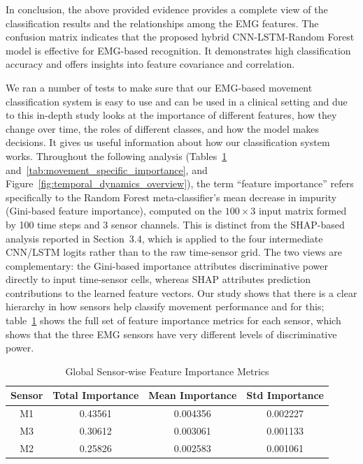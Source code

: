 \documentclass{elektr}
\newcommand{\yh}[1]{{\color{revhi}#1}}  %
\begin{document}
In conclusion, the above provided evidence provides a complete view of the classification results and the relationships among the EMG features. The confusion matrix indicates that the proposed hybrid CNN-LSTM-Random Forest model is effective for EMG-based recognition. It demonstrates high classification accuracy and offers insights into feature covariance and correlation.

We ran a number of tests to make sure that our EMG-based movement classification system is easy to use and can be used in a clinical setting and due to this in-depth study looks at the importance of different features, how they change over time, the roles of different classes, and how the model makes decisions. It gives us useful information about how our classification system works.
\yh{Throughout the following analysis (Tables~\ref{tab:global_sensor_importance} and~\ref{tab:movement_specific_importance}, and Figure~\ref{fig:temporal_dynamics_overview}), the term ``feature importance'' refers specifically to the Random Forest meta-classifier's mean decrease in impurity (Gini-based feature importance), computed on the $100 \times 3$ input matrix formed by 100 time steps and 3 sensor channels. This is distinct from the SHAP-based analysis reported in Section~3.4, which is applied to the four intermediate CNN/LSTM logits rather than to the raw time-sensor grid. The two views are complementary: the Gini-based importance attributes discriminative power directly to input time-sensor cells, whereas SHAP attributes prediction contributions to the learned feature vectors.}
Our study shows that there is a clear hierarchy in how sensors help classify movement performance and for this; table~\ref{tab:global_sensor_importance} shows the full set of feature importance metrics for each sensor, which shows that the three EMG sensors have very different levels of discriminative power.
\begin{table}[h]
	\centering
	\caption{Global Sensor-wise Feature Importance Metrics}
	\label{tab:global_sensor_importance}
	\begin{tabular}{|c|c|c|c|}
		\hline
		\textbf{Sensor} & \textbf{Total Importance} & \textbf{Mean Importance} & \textbf{Std Importance} \\
		\hline
		M1 & 0.43561 & 0.004356 & 0.002227 \\
		M3 & 0.30612 & 0.003061 & 0.001133 \\
		M2 & 0.25826 & 0.002583 & 0.001061 \\
		\hline
	\end{tabular}
\end{table}
\end{document}
